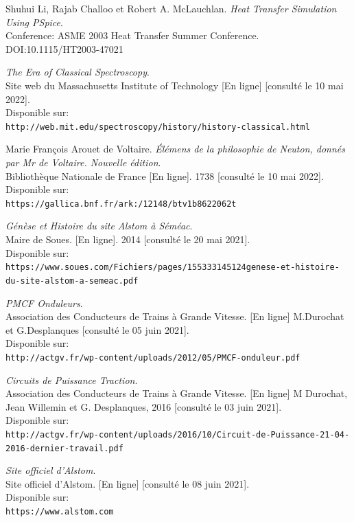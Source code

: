 \documentclass[a4paper]{report}
\begin{document}
	
	\renewcommand{\bibname}{Références} %
	\begin{thebibliography}{9}
		
		
		Shuhui Li, Rajab Challoo et Robert A. McLauchlan. 
		\textit{Heat Transfer Simulation Using PSpice}.\\ 
		Conference: ASME 2003 Heat Transfer Summer Conference.\\
		DOI:10.1115/HT2003-47021
		
		\textit{The Era of Classical Spectroscopy}.\\ 
		Site web du Massachusetts Institute of Technology [En ligne] [consulté le 10 mai 2022].\\
		Disponible sur: \\\texttt{http://web.mit.edu/spectroscopy/history/history-classical.html}		
		
		Marie François Arouet de Voltaire. 
		\textit{Élémens de la philosophie de Neuton, donnés par Mr de Voltaire. Nouvelle édition}.\\ 
		Bibliothèque Nationale de France [En ligne]. 1738 [consulté le 10 mai 2022].\\
		Disponible sur: \\\texttt{https://gallica.bnf.fr/ark:/12148/btv1b8622062t}
		
		\textit{Génèse et Histoire du site Alstom à Séméac}.\\
		Maire de Soues. [En ligne]. 2014 [consulté le 20 mai 2021].\\
		Disponible sur: \\\texttt{https://www.soues.com/Fichiers/pages/155333145124genese-et-histoire-du-site-alstom-a-semeac.pdf}
		
		\textit{PMCF Onduleurs}.\\
		Association des Conducteurs de Trains à Grande Vitesse. [En ligne] M.Durochat et G.Desplanques [consulté le 05 juin 2021].\\
		Disponible sur: \\\texttt{http://actgv.fr/wp-content/uploads/2012/05/PMCF-onduleur.pdf}
		
		\textit{Circuits de Puissance Traction}.\\
		Association des Conducteurs de Trains à Grande Vitesse. [En ligne] M Durochat, Jean Willemin et G. Desplanques, 2016 [consulté le 03 juin 2021].\\
		Disponible sur: \\\texttt{http://actgv.fr/wp-content/uploads/2016/10/Circuit-de-Puissance-21-04-2016-dernier-travail.pdf}
		
		\textit{Site officiel d'Alstom}.\\
		Site officiel d'Alstom. [En ligne] [consulté le 08 juin 2021].\\
		Disponible sur: \\\texttt{https://www.alstom.com}
		
	\end{thebibliography}
	
	
\end{document}
